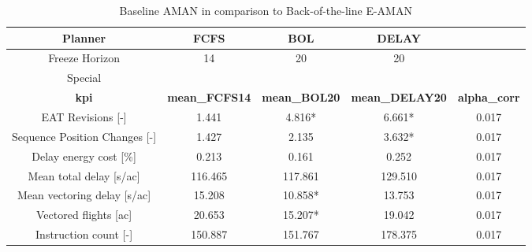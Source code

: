 \begin{table}[htbp]
\caption{Baseline AMAN in comparison to Back-of-the-line E-AMAN}
\begin{center}
\footnotesize
\setlength{\tabcolsep}{3pt}
\renewcommand{\arraystretch}{1.000}
\begin{tabular}{|c|c|c|c|c|}
\hline
Planner & FCFS & BOL & DELAY &  \\
\hline
Freeze Horizon & 14 & 20 & 20 &  \\
\hline
Special &  &  &  &  \\
\hline
\textbf{kpi} & \textbf{mean\_FCFS14} & \textbf{mean\_BOL20} & \textbf{mean\_DELAY20} & \textbf{alpha\_corr} \\
\hline
EAT Revisions [-] & 1.441 & 4.816* & 6.661* & 0.017 \\
\hline
Sequence Position Changes [-] & 1.427 & 2.135 & 3.632* & 0.017 \\
\hline
Delay energy cost [\%] & 0.213 & 0.161 & 0.252 & 0.017 \\
\hline
Mean total delay [s/ac] & 116.465 & 117.861 & 129.510 & 0.017 \\
\hline
Mean vectoring delay [s/ac] & 15.208 & 10.858* & 13.753 & 0.017 \\
\hline
Vectored flights [ac] & 20.653 & 15.207* & 19.042 & 0.017 \\
\hline
Instruction count [-] & 150.887 & 151.767 & 178.375 & 0.017 \\
\hline
\end{tabular}
\label{tab:baseline\_aman\_in\_comparison\_to\_back-of-the-line\_e-aman}
\end{center}
\end{table}